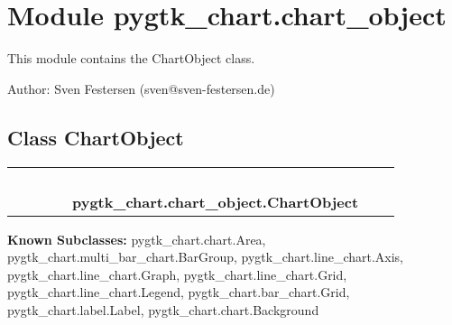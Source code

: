 %
%
%


\section{Module pygtk\_chart.chart\_object}

    \label{pygtk_chart:chart_object}
This module contains the ChartObject class.

Author: Sven Festersen (sven@sven-festersen.de)



\subsection{Class ChartObject}

    \label{pygtk_chart:chart_object:ChartObject}
\begin{tabular}{cccccccc}
\multicolumn{2}{r}{\settowidth{\BCL}{object}\multirow{2}{\BCL}{object}}
&&
&&
  \\\cline{3-3}
  &&\multicolumn{1}{c|}{}
&&
&&
  \\
\multicolumn{4}{r}{\settowidth{\BCL}{??.GObject}\multirow{2}{\BCL}{??.GObject}}
&&
  \\\cline{5-5}
  &&&&\multicolumn{1}{c|}{}
&&
  \\
&&&&\multicolumn{2}{l}{\textbf{pygtk\_chart.chart\_object.ChartObject}}
\end{tabular}

\textbf{Known Subclasses:}
pygtk\_chart.chart.Area,
    pygtk\_chart.multi\_bar\_chart.BarGroup,
    pygtk\_chart.line\_chart.Axis,
    pygtk\_chart.line\_chart.Graph,
    pygtk\_chart.line\_chart.Grid,
    pygtk\_chart.line\_chart.Legend,
    pygtk\_chart.bar\_chart.Grid,
    pygtk\_chart.label.Label,
    pygtk\_chart.chart.Background

